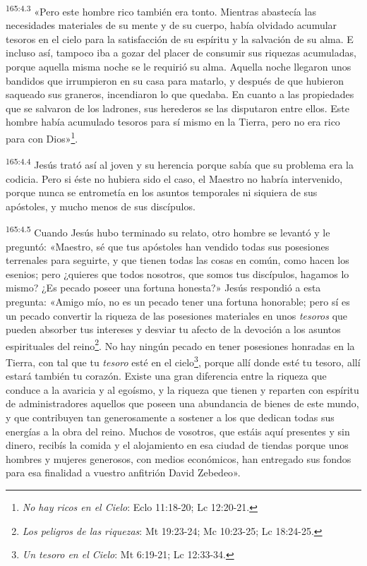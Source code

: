 \par 
\textsuperscript{165:4.3} «Pero este hombre rico también era tonto. Mientras abastecía las necesidades materiales de su mente y de su cuerpo, había olvidado acumular tesoros en el cielo para la satisfacción de su espíritu y la salvación de su alma. E incluso así, tampoco iba a gozar del placer de consumir sus riquezas acumuladas, porque aquella misma noche se le requirió su alma. Aquella noche llegaron unos bandidos que irrumpieron en su casa para matarlo, y después de que hubieron saqueado sus graneros, incendiaron lo que quedaba. En cuanto a las propiedades que se salvaron de los ladrones, sus herederos se las disputaron entre ellos. Este hombre había acumulado tesoros para sí mismo en la Tierra, pero no era rico para con Dios»\footnote{\textit{No hay ricos en el Cielo}: Eclo 11:18-20; Lc 12:20-21.}.

\par 
\textsuperscript{165:4.4} Jesús trató así al joven y su herencia porque sabía que su problema era la codicia. Pero si éste no hubiera sido el caso, el Maestro no habría intervenido, porque nunca se entrometía en los asuntos temporales ni siquiera de sus apóstoles, y mucho menos de sus discípulos.

\par 
\textsuperscript{165:4.5} Cuando Jesús hubo terminado su relato, otro hombre se levantó y le preguntó: «Maestro, sé que tus apóstoles han vendido todas sus posesiones terrenales para seguirte, y que tienen todas las cosas en común, como hacen los esenios; pero ¿quieres que todos nosotros, que somos tus discípulos, hagamos lo mismo? ¿Es pecado poseer una fortuna honesta?» Jesús respondió a esta pregunta: «Amigo mío, no es un pecado tener una fortuna honorable; pero sí es un pecado convertir la riqueza de las posesiones materiales en unos \textit{tesoros} que pueden absorber tus intereses y desviar tu afecto de la devoción a los asuntos espirituales del reino\footnote{\textit{Los peligros de las riquezas}: Mt 19:23-24; Mc 10:23-25; Lc 18:24-25.}. No hay ningún pecado en tener posesiones honradas en la Tierra, con tal que tu \textit{tesoro} esté en el cielo\footnote{\textit{Un tesoro en el Cielo}: Mt 6:19-21; Lc 12:33-34.}, porque allí donde esté tu tesoro, allí estará también tu corazón. Existe una gran diferencia entre la riqueza que conduce a la avaricia y al egoísmo, y la riqueza que tienen y reparten con espíritu de administradores aquellos que poseen una abundancia de bienes de este mundo, y que contribuyen tan generosamente a sostener a los que dedican todas sus energías a la obra del reino. Muchos de vosotros, que estáis aquí presentes y sin dinero, recibís la comida y el alojamiento en esa ciudad de tiendas porque unos hombres y mujeres generosos, con medios económicos, han entregado sus fondos para esa finalidad a vuestro anfitrión David Zebedeo».

